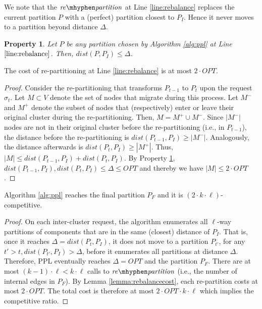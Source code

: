 \documentclass[manuscript,screen=true]{acmart}
\newcommand{\OPT}{\mathit{OPT}}
\newtheorem{property}{Property}
\newcommand\mahmoud[1]{\color{green}\textbf{\\ Mahmoud: #1}\\\color{black}}
\newcommand\maciek[1]{\color{brown}\textbf{\\ Maciek: #1}\color{black}}
\begin{document}
      We note that the $\mathit{re\mhyphen partition}$ at Line \ref{line:rebalance} replaces the current partition $P$ with a (perfect) partition closest to $P_I$.
Hence it never moves to a partition beyond distance $\Delta$.      
\begin{property} \label{prop:dist<OPT}
    Let $P$ be any partition chosen by Algorithm \ref{alg:ppl} at Line $\ref{line:rebalance}$.
    Then, $\mathit{dist}(P,P_I) \leq \Delta$.
\end{property}

\begin{lemma}	\label{lemma:rebalancecost}
    The cost of re-partitioning at Line \ref{line:rebalance} is at most $2\cdot\OPT$.
\end{lemma}
\begin{proof}
    Consider the re-partitioning that transforms $P_{t-1}$ to $P_t$ upon the request $\sigma_t$.
    Let $M \subset V$ denote the set of nodes that migrate during this process.
	Let $M^-$ and $M^+$ denote the subset of nodes that (respectively)
    enter or leave their original cluster during the re-partitioning.    
    Then,
    $M = M^+ \cup M^-$.
    Since $|M^-|$ nodes are not in their original cluster before the re-partitioning (i.e., in $P_{t-1}$),
    the distance before the re-partitioning is $\mathit{dist}(P_{t-1},P_I) \geq | M^-|$.
    Analogously,
     the distance afterwards is $\mathit{dist}(P_{t},P_I) \geq | M^+|$.
    Thus,
    $|M| \leq \mathit{dist}(P_{t-1},P_I) + \mathit{dist}(P_{t},P_I)$.
    By Property \ref{prop:dist<OPT},
    $\mathit{dist}(P_{t-1},P_I) , \mathit{dist}(P_{t},P_I) \leq \Delta \leq \OPT$
    and thereby we have	
    $|M| \leq 2\cdot\OPT$.
\end{proof}

\begin{theorem}	\label{thm:upperbound}
    Algorithm \ref{alg:ppl} reaches the final partition $P_F$ and it is $(2\cdot k\cdot\ell)$-competitive.
\end{theorem}
\begin{proof}
      On each inter-cluster request,
     the algorithm enumerates all $\ell$-way partitions of components
     that are in the same (closest) distance of $P_I$.
     That is, 
     once it reaches $\Delta = \mathit{dist} (P_{t}, P_I)$,
     it does not move to a partition
     $P_{t'}$, for any $t'>t,\mathit{dist} (P_{t'}, P_I) > \Delta$,
     before it enumerates all partitions at distance $\Delta$.
     Therefore,
     PPL eventually reaches $\Delta=\OPT$ and the partition $P_F$.
    There are at most $(k-1)\cdot\ell < k\cdot\ell $ calls   to $\mathit{re\mhyphen partition}$
     (i.e., the number of internal edges in $P_F$).
    By Lemma \ref{lemma:rebalancecost},
    each re-partition costs at most $2\cdot\OPT$.
    The total cost is therefore at most $2\cdot\OPT\cdot k\cdot\ell$ which implies the competitive ratio.
 \end{proof}
\end{document}
